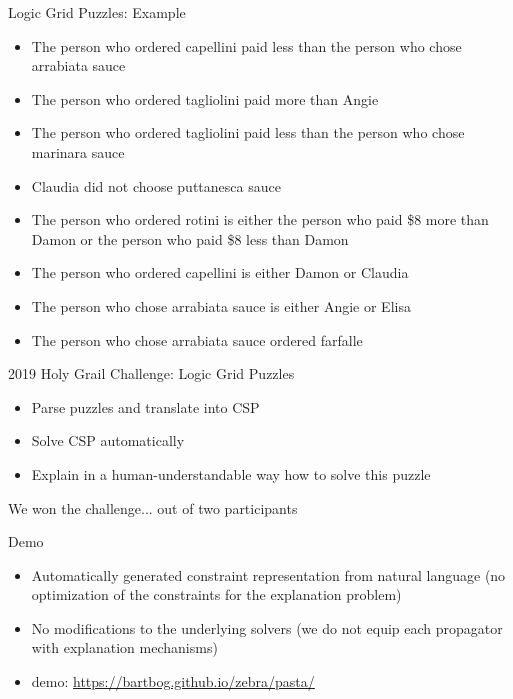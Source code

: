 \documentclass[12pt,aspectratio=169]{beamer}
\begin{document}
\begin{frame}{Logic Grid Puzzles: Example}
 \begin{itemize}
  \item The person who ordered capellini paid less than the person who chose arrabiata sauce
\item The person who ordered tagliolini paid more than Angie
\item The person who ordered tagliolini paid less than the person who chose marinara sauce
\item Claudia did not choose puttanesca sauce
\item The person who ordered rotini is either the person who paid \$8 more than Damon or the person who paid \$8 less than Damon
\item The person who ordered capellini is either Damon or Claudia
\item The person who chose arrabiata sauce is either Angie or Elisa
\item The person who chose arrabiata sauce ordered farfalle
 \end{itemize}
\end{frame}



\begin{frame}{2019 Holy Grail Challenge: Logic Grid Puzzles}
 \begin{itemize}
    \item Parse puzzles and translate into CSP
    \item Solve CSP automatically
    \item Explain in a human-understandable way how to solve this puzzle
 \end{itemize}
 \pause
 We won the challenge...
\pause
out of two participants 
 
\end{frame}


\begin{frame}{Demo}
 \begin{itemize}
   \item Automatically generated constraint representation from natural language (no optimization of the constraints for the explanation problem)
   \item No modifications to the underlying solvers (we do not equip each propagator with explanation mechanisms)
   \item demo:   \url{https://bartbog.github.io/zebra/pasta/}
 \end{itemize}

\end{frame}
\end{document}
